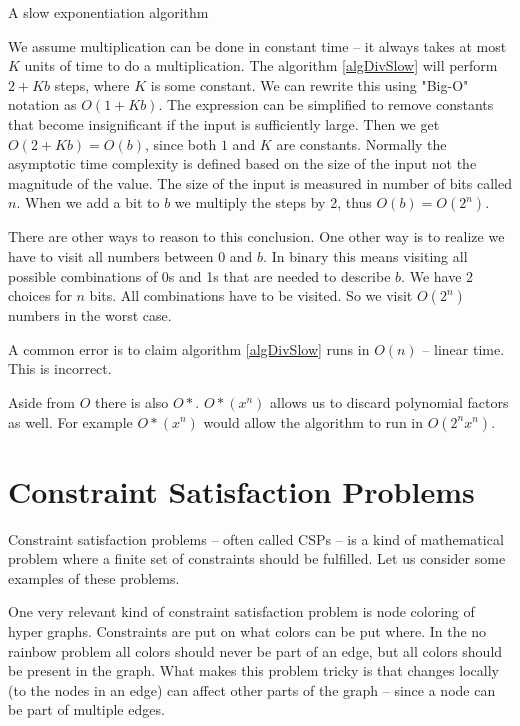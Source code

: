 \documentclass[msc,lith,english]{liuthesis}
\begin{document}
\begin{algorithm}
\caption{A slow exponentiation algorithm}\label{algDivSlow}
\DontPrintSemicolon
{}

\end{algorithm}

We assume multiplication can be done in constant time -- it always takes at most $K$ units of time to do a multiplication.
The algorithm \ref{algDivSlow} will perform $ 2 + Kb $ steps, where $K$ is some
constant. We can rewrite this using "Big-O" notation as $O(1 + Kb)$. The expression can be
simplified to remove constants that become insignificant if the
input is sufficiently large. Then we get $O(2 + Kb) = O(b)$, since both $1$ and $K$ are constants. 
Normally the asymptotic time complexity is defined based on the size of the input not the magnitude of the value.
The size of the input is measured in number of bits called $n$. When we add a bit to $b$ we multiply the steps by 2,
thus $O(b) = O(2^n)$.

There are other ways to reason to this conclusion.
One other way is to realize we have to visit all numbers between $0$ and $b$.
In binary this means visiting all possible combinations of 0s and 1s that are needed to describe $b$.
We have 2 choices for $n$ bits. All combinations have to be visited. So we visit $O(2^n)$ numbers in the worst case.
\cite[Chapter 3]{sourceAlgoBook}

A common error is to claim algorithm \ref{algDivSlow} runs in $O(n)$ -- linear time. This is incorrect.

Aside from $O$ there is also $O*$. $O*(x^n)$ allows us to discard polynomial factors as well. For example $O*(x^n)$ would allow the algorithm to run in $O(2^nx^n)$.

\section{Constraint Satisfaction Problems}
Constraint satisfaction problems -- often called CSPs -- is a kind of mathematical problem where a finite set of constraints should be fulfilled. Let us consider some examples of these problems.

One very relevant kind of constraint satisfaction problem is node coloring of hyper graphs.
Constraints are put on what colors can be put where. In the no rainbow problem all colors should never be part of an edge, but all colors should be present in the graph. What makes this problem tricky is that changes locally (to the nodes in an edge) can affect other parts of the graph -- since a node can be part of multiple edges.
\end{document}
